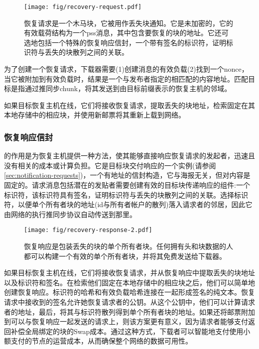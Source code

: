 \begin{figure}[htbp]
  \centering
  \texttt{[image: fig/recovery-request.pdf]}
  \caption[恢复请求\statusgreen]{恢复请求是一个木马块，它被用作丢失块通知。它是未加密的，它的有效载荷结构为一个pss消息，其中包含要恢复的块的地址。它还可选地包括一个特殊的恢复响应信封，一个带有签名的标识符，证明标识符与丢失的块散列之间的关联。}
  \label{fig:recovery-request}
\end{figure}

为了创建一个恢复请求，下载器需要(1)创建消息的有效负载(2)找到一个nonce，当它被附加到有效负载时，结果是一个与发布者指定的相匹配的内容地址。匹配目标是指通过推同步chunk，将其发送到由目标前缀表示的恢复主机的邻域。

如果目标恢复主机在线，它们将接收恢复请求，提取丢失的块地址，检索固定在其本地存储中的相应块，并使用新邮票将其重新上载到网络。

\subsubsection{恢复响应信封}

的作用是为恢复主机提供一种方法，使其能够直接响应恢复请求的发起者，迅速且没有相关的成本或计算负担。它是目标块交付响应的一个实例(请参阅\ref{sec:notification-requests})，一个有地址的信封构造，它与海报无关，但对内容是固定的。请求消息包括潜在的发贴者需要创建有效的目标块传递响应的组件:一个标识符，该标识符具有签名，证明标识符与丢失的块散列之间的关联。选择标识符，以便单个所有者块的地址(id与所有者帐户的散列)落入请求者的邻居，因此它由网络的执行推同步协议自动传送到那里。

\begin{figure}[htbp]
\centering
\texttt{[image: fig/recovery-response-2.pdf]}
\caption[恢复响应\statusgreen]{恢复响应是包装丢失的块的单个所有者块。任何拥有头和块数据的人都可以构建一个有效的单个所有者块，并将其免费发送给下载器。}
\label{fig:recovery-response}
\end{figure}

如果目标恢复主机在线，它们将接收恢复请求，并从恢复响应中提取丢失的块地址以及标识符和签名。在检索他们固定在本地存储中的相应块之后，他们可以简单地创建恢复响应。标识符的哈希和有效负载哈希连接在一起形成签名的纯文本。恢复请求中接收到的签名允许她恢复请求者的公钥。从这个公钥中，他们可以计算请求者的地址，最后，将其与标识符散列得到单个所有者块的地址。如果还将邮票附加到可以与恢复响应一起发送的请求上，则该方案更有意义，因为请求者能够支付返回补偿全局绑定的块的Swap成本。通过这种方式，下载者可以智能地支付使用小额支付的节点的运营成本，从而确保整个网络的数据可用性。



